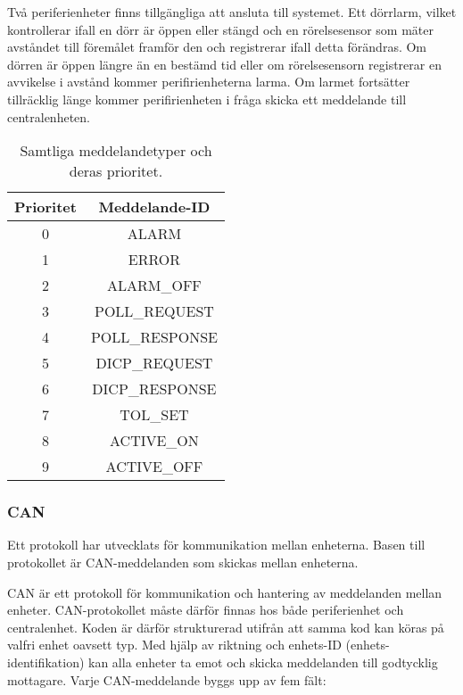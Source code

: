 \documentclass[a4paper]{article}
\begin{document}
Två periferienheter finns tillgängliga att ansluta till systemet.
Ett dörrlarm, vilket kontrollerar ifall en dörr är öppen eller stängd och en rörelsesensor som mäter avståndet till föremålet framför den och registrerar ifall detta förändras.
Om dörren är öppen längre än en bestämd tid eller om rörelsesensorn registrerar en avvikelse i avstånd kommer perifirienheterna larma.
Om larmet fortsätter tillräcklig länge kommer perifirienheten i fråga skicka ett meddelande till centralenheten.

\begin{table}[H]
  \centering
  \begin{tabular}{|c|c|}\hline
    Prioritet & Meddelande-ID \\\hline
    0 & ALARM \\\hline
    1 & ERROR \\\hline
	2 & ALARM\_OFF \\\hline
	3 & POLL\_REQUEST \\\hline
	4 & POLL\_RESPONSE \\\hline
    5 & DICP\_REQUEST \\\hline
    6 & DICP\_RESPONSE \\\hline
    7 & TOL\_SET \\\hline
    8 & ACTIVE\_ON \\\hline
    9 & ACTIVE\_OFF \\\hline
  \end{tabular}
  \caption{Samtliga meddelandetyper och deras prioritet.}
  \label{tab:meddelandetyper}
\end{table}


\subsubsection{CAN}
Ett protokoll har utvecklats för kommunikation mellan enheterna.
Basen till protokollet är CAN-meddelanden som skickas mellan enheterna.

CAN är ett protokoll för kommunikation och hantering av meddelanden mellan enheter.
CAN-protokollet måste därför finnas hos både periferienhet och centralenhet.
Koden är därför strukturerad utifrån att samma kod kan köras på valfri enhet oavsett typ.
Med hjälp av riktning och enhets-ID (enhets-identifikation) kan alla enheter ta emot och skicka meddelanden till godtycklig mottagare.
Varje CAN-meddelande byggs upp av fem fält:
\end{document}
